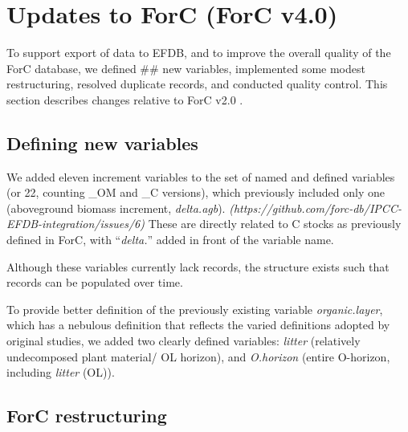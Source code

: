 \documentclass[, manuscript]{copernicus}
\begin{document}
\section{Updates to ForC (ForC v4.0)}

To support export of data to EFDB, and to improve the overall quality of
the ForC database, we defined \#\# new variables, implemented some
modest restructuring, resolved duplicate records, and conducted quality
control. This section describes changes relative to ForC v2.0
\citep{anderson-teixeira_forc_2018}.

\subsection{Defining new variables}

We added eleven increment variables to the set of named and defined
variables (or 22, counting \_OM and \_C versions), which previously
included only one (aboveground biomass increment, \emph{delta.agb}).
\emph{(https://github.com/forc-db/IPCC-EFDB-integration/issues/6)} These
are directly related to C stocks as previously defined in ForC, with
``\emph{delta.}'' added in front of the variable name.

Although these variables currently lack records, the structure exists
such that records can be populated over time.

To provide better definition of the previously existing variable
\emph{organic.layer}, which has a nebulous definition that reflects the
varied definitions adopted by original studies, we added two clearly
defined variables: \emph{litter} (relatively undecomposed plant
material/ OL horizon), and \emph{O.horizon} (entire O-horizon, including
\emph{litter} (OL)).

\subsection{ForC restructuring}
\end{document}

